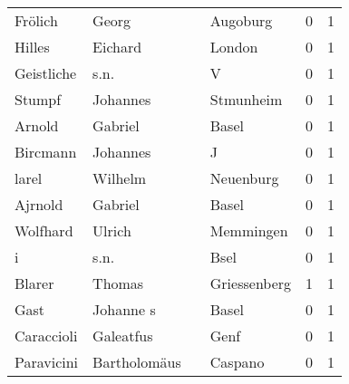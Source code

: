 \documentclass[10pt,a4paper,landscape]{article}
\begin{document}
\begin{longtable}{llllrr}
                  Frölich &                              Georg &             &                                    Augoburg &          0 &         1 \\
                   Hilles &                            Eichard &             &                                      London &          0 &         1 \\
               Geistliche &                               s.n. &             &                                           V &          0 &         1 \\
                   Stumpf &                           Johannes &             &                                   Stmunheim &          0 &         1 \\
                   Arnold &                            Gabriel &             &                                       Basel &          0 &         1 \\
                 Bircmann &                           Johannes &             &                                           J &          0 &         1 \\
                    larel &                            Wilhelm &             &                                   Neuenburg &          0 &         1 \\
                  Ajrnold &                            Gabriel &             &                                       Basel &          0 &         1 \\
                 Wolfhard &                             Ulrich &             &                                   Memmingen &          0 &         1 \\
                        i &                               s.n. &             &                                        Bsel &          0 &         1 \\
                   Blarer &                             Thomas &             &                                Griessenberg &          1 &         1 \\
                     Gast &                          Johanne s &             &                                       Basel &          0 &         1 \\
               Caraccioli &                          Galeatfus &             &                                        Genf &          0 &         1 \\
               Paravicini &                       Bartholomäus &             &                                     Caspano &          0 &         1 \\

\end{longtable}
\end{document}
